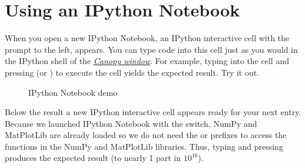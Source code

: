 \documentclass[letterpaper,10pt,english]{sphinxmanual}
\begin{document}
\section{Using an IPython Notebook}
\label{apdx2/apdx2_ipynb:using-an-ipython-notebook}
When you open a new IPython Notebook, an IPython interactive cell with the prompt  to the left, appears.  You can type code into this cell just as you would in the IPython shell of the {\hyperref[chap2/chap2_basics:fig-canopywindow]{\emph{Canopy window}}}.  For example, typing  into the cell and pressing  (or ) to execute the cell yields the expected result.  Try it out.
\begin{figure}[htbp]
\centering
\capstart

\caption{IPython Notebook demo}\label{apdx2/apdx2_ipynb:fig-firstipynbcells}\end{figure}

Below the result a new IPython interactive cell appears ready for your next entry.  Because we launched IPython Notebook with the  switch, NumPy and MatPlotLib are already loaded so we do not need the  or  prefixes to access the functions in the NumPy and MatPlotLib libraries.  Thus, typing  and pressing  produces the expected result (to nearly 1 part in \(10^{16}\)).
\end{document}
